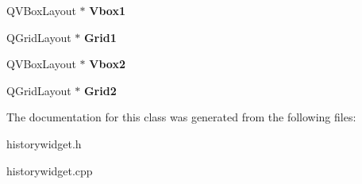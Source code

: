 \begin{DoxyCompactItemize}
Q\+V\+Box\+Layout $\ast$ {\bfseries Vbox1}
\item 
\mbox{\label{classhistoryWidget_a0169902495ed88912cc1fea0fcbb947b}} 
Q\+Grid\+Layout $\ast$ {\bfseries Grid1}
\item 
\mbox{\label{classhistoryWidget_a30347ea1f79c4beabd11da5cb6c29b48}} 
Q\+V\+Box\+Layout $\ast$ {\bfseries Vbox2}
\item 
\mbox{\label{classhistoryWidget_af116aab734f0bd61e5a02891b738f911}} 
Q\+Grid\+Layout $\ast$ {\bfseries Grid2}
\end{DoxyCompactItemize}


The documentation for this class was generated from the following files\+:\begin{DoxyCompactItemize}
\item 
historywidget.\+h\item 
historywidget.\+cpp\end{DoxyCompactItemize}
